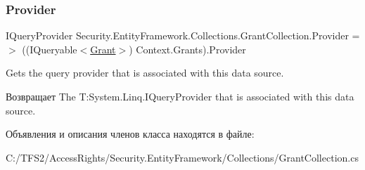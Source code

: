 \subsubsection{\texorpdfstring{Provider}{Provider}}
{\footnotesize\ttfamily I\+Query\+Provider Security.\+Entity\+Framework.\+Collections.\+Grant\+Collection.\+Provider =$>$ ((I\+Queryable$<$\hyperlink{class_security_1_1_model_1_1_grant}{Grant}$>$) Context.\+Grants).Provider}



Gets the query provider that is associated with this data source. 

\begin{DoxyReturn}{Возвращает}
The T\+:\+System.\+Linq.\+I\+Query\+Provider that is associated with this data source. 
\end{DoxyReturn}


Объявления и описания членов класса находятся в файле\+:\begin{DoxyCompactItemize}
\item 
C\+:/\+T\+F\+S2/\+Access\+Rights/\+Security.\+Entity\+Framework/\+Collections/Grant\+Collection.\+cs\end{DoxyCompactItemize}
